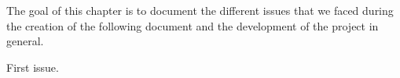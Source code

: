 The goal of this chapter is to document the different issues that we faced during the creation of the following document and the development of the project in general.

First issue.
